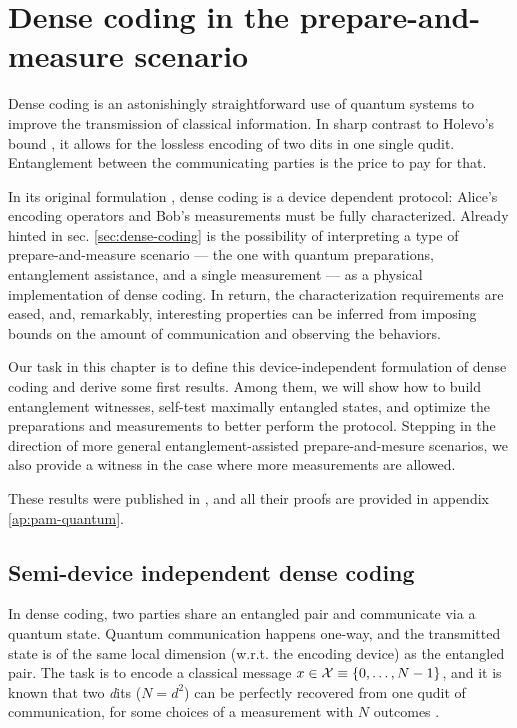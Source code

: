 \chapter{Dense coding in the prepare-and-measure scenario}
\label{chap:pam-quantum}

    Dense coding is an astonishingly straightforward use of quantum systems to improve the transmission of classical information. In sharp contrast to Holevo's bound \cite{holevo-bound-1973}, it allows for the lossless encoding of two dits in one single qudit. Entanglement between the communicating parties is the price to pay for that.

    In its original formulation \cite{bennett_1992_superdense}, dense coding is a device dependent protocol: Alice's encoding operators and Bob's measurements must be fully characterized. Already hinted in sec. \ref{sec:dense-coding} is the possibility of interpreting a type of prepare-and-measure scenario --- the one with quantum preparations, entanglement assistance, and a single measurement --- as a physical implementation of dense coding. In return, the characterization requirements are eased, and, remarkably, interesting properties can be inferred from imposing bounds on the amount of communication and observing the behaviors.

    Our task in this chapter is to define this device-independent formulation of dense coding and derive some first results. Among them, we will show how to build entanglement witnesses, self-test maximally entangled states, and optimize the preparations and measurements to better perform the protocol. Stepping in the direction of more general entanglement-assisted prepare-and-mesure scenarios, we also provide a witness in the case where more measurements are allowed.

    These results were published in \cite{moreno_pamdense_2021}, and all their proofs are provided in appendix \ref{ap:pam-quantum}.


    \section{Semi-device independent dense coding}
    \label{sec:sdi-dense-coding}
        In dense coding, two parties share an entangled pair and communicate via a quantum state. Quantum communication happens one-way, and the transmitted state is of the same local dimension (w.r.t. the encoding device) as the entangled pair. The task is to encode a classical message $x \in \mathcal{X} \equiv \{ 0, \ldots, N-1 \}$, and it is known that two \emph{d}its ($N = d^2$) can be perfectly recovered from one qudit of communication, for some choices of a measurement with $N$ outcomes \cite{}.
    
